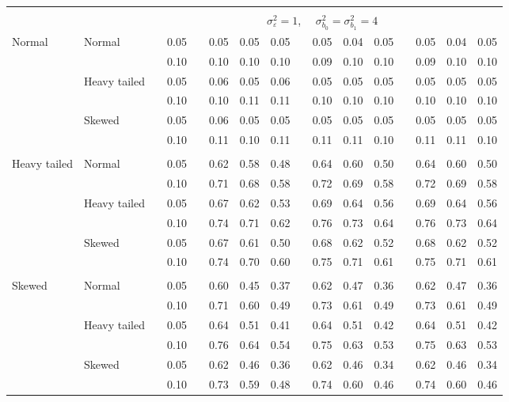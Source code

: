 \documentclass{article} %
\begin{document}
\begin{table}[ht]
\begin{scriptsize}
\begin{center}
\begin{tabular}{ll p{.1cm} c p{.1cm} rrr p{.1cm} rrr p{.1cm} rrr}
&&&&&&&&&&&&&&&\\
& && && \multicolumn{9}{c}{$\sigma_{\varepsilon}^2 = 1$, \ \ $\sigma_{b_0}^2 = \sigma_{b_1}^2 = 4$} \\ \cline{6-16}
\rowcolor{gray!20}Normal       & Normal       && 0.05 &&   0.05 & 0.05 & 0.05 && 0.05 & 0.04 & 0.05 && 0.05 & 0.04 & 0.05 \\ 
\rowcolor{gray!20}             &              && 0.10 &&   0.10 & 0.10 & 0.10 && 0.09 & 0.10 & 0.10 && 0.09 & 0.10 & 0.10 \\ 
\rowcolor{gray!20}             & Heavy tailed && 0.05 &&   0.06 & 0.05 & 0.06 && 0.05 & 0.05 & 0.05 && 0.05 & 0.05 & 0.05 \\ 
\rowcolor{gray!20}             &              && 0.10 &&   0.10 & 0.11 & 0.11 && 0.10 & 0.10 & 0.10 && 0.10 & 0.10 & 0.10 \\ 
\rowcolor{gray!20}             & Skewed       && 0.05 &&   0.06 & 0.05 & 0.05 && 0.05 & 0.05 & 0.05 && 0.05 & 0.05 & 0.05 \\ 
\rowcolor{gray!20}             &              && 0.10 &&   0.11 & 0.10 & 0.11 && 0.11 & 0.11 & 0.10 && 0.11 & 0.11 & 0.10 \\ 
             &&&&&&&&&&&&&&&\\
Heavy tailed & Normal       && 0.05 &&   0.62 & 0.58 & 0.48 && 0.64 & 0.60 & 0.50 && 0.64 & 0.60 & 0.50 \\ 
             &              && 0.10 &&   0.71 & 0.68 & 0.58 && 0.72 & 0.69 & 0.58 && 0.72 & 0.69 & 0.58 \\ 
             & Heavy tailed && 0.05 &&   0.67 & 0.62 & 0.53 && 0.69 & 0.64 & 0.56 && 0.69 & 0.64 & 0.56 \\ 
             &              && 0.10 &&   0.74 & 0.71 & 0.62 && 0.76 & 0.73 & 0.64 && 0.76 & 0.73 & 0.64 \\ 
             & Skewed       && 0.05 &&   0.67 & 0.61 & 0.50 && 0.68 & 0.62 & 0.52 && 0.68 & 0.62 & 0.52 \\ 
             &              && 0.10 &&   0.74 & 0.70 & 0.60 && 0.75 & 0.71 & 0.61 && 0.75 & 0.71 & 0.61 \\ 
             &&&&&&&&&&&&&&&\\
Skewed       & Normal       && 0.05 &&   0.60 & 0.45 & 0.37 && 0.62 & 0.47 & 0.36 && 0.62 & 0.47 & 0.36 \\ 
             &              && 0.10 &&   0.71 & 0.60 & 0.49 && 0.73 & 0.61 & 0.49 && 0.73 & 0.61 & 0.49 \\ 
             & Heavy tailed && 0.05 &&   0.64 & 0.51 & 0.41 && 0.64 & 0.51 & 0.42 && 0.64 & 0.51 & 0.42 \\ 
             &              && 0.10 &&   0.76 & 0.64 & 0.54 && 0.75 & 0.63 & 0.53 && 0.75 & 0.63 & 0.53 \\ 
             & Skewed       && 0.05 &&   0.62 & 0.46 & 0.36 && 0.62 & 0.46 & 0.34 && 0.62 & 0.46 & 0.34 \\ 
             &              && 0.10 &&   0.73 & 0.59 & 0.48 && 0.74 & 0.60 & 0.46 && 0.74 & 0.60 & 0.46 \\ 


\end{tabular}
\end{center}
\end{scriptsize}
\end{table}
\end{document}
